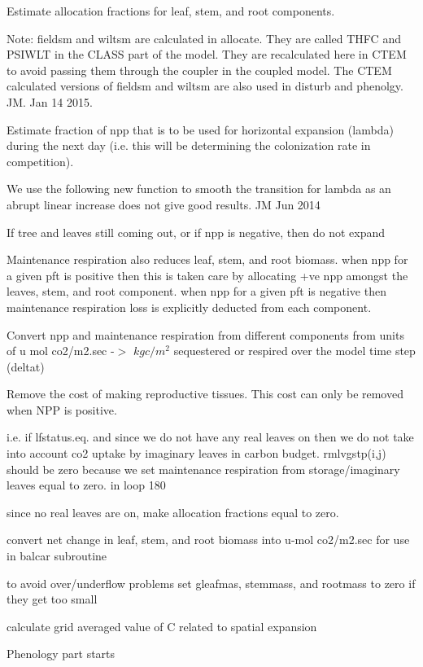 Estimate allocation fractions for leaf, stem, and root components.

Note\+: fieldsm and wiltsm are calculated in allocate. They are called T\+H\+F\+C and P\+S\+I\+W\+L\+T in the C\+L\+A\+S\+S part of the model. They are recalculated here in C\+T\+E\+M to avoid passing them through the coupler in the coupled model. The C\+T\+E\+M calculated versions of fieldsm and wiltsm are also used in disturb and phenolgy. J\+M. Jan 14 2015.

Estimate fraction of npp that is to be used for horizontal expansion (lambda) during the next day (i.\+e. this will be determining the colonization rate in competition).

We use the following new function to smooth the transition for lambda as an abrupt linear increase does not give good results. J\+M Jun 2014

If tree and leaves still coming out, or if npp is negative, then do not expand

Maintenance respiration also reduces leaf, stem, and root biomass. when npp for a given pft is positive then this is taken care by allocating +ve npp amongst the leaves, stem, and root component. when npp for a given pft is negative then maintenance respiration loss is explicitly deducted from each component.

Convert npp and maintenance respiration from different components from units of u mol co2/m2.\+sec -\/$>$ $kg c/m^2$ sequestered or respired over the model time step (deltat)

Remove the cost of making reproductive tissues. This cost can only be removed when N\+P\+P is positive.

i.\+e. if lfstatus.\+eq. and since we do not have any real leaves on then we do not take into account co2 uptake by imaginary leaves in carbon budget. rmlvgstp(i,j) should be zero because we set maintenance respiration from storage/imaginary leaves equal to zero. in loop 180

since no real leaves are on, make allocation fractions equal to zero.

convert net change in leaf, stem, and root biomass into u-\/mol co2/m2.\+sec for use in balcar subroutine

to avoid over/underflow problems set gleafmas, stemmass, and rootmass to zero if they get too small

calculate grid averaged value of C related to spatial expansion

Phenology part starts

